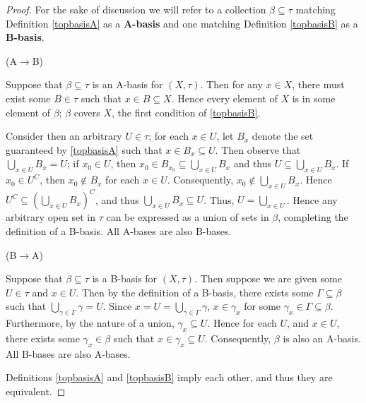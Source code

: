 \documentclass{article}
\theoremstyle{definition}
\newcommand{\p}[1]{\left(#1\right)}
\begin{document}
\begin{proof}
For the sake of discussion we will refer to a collection $\beta \subseteq\tau$ 
matching Definition \ref{topbasisA} as a \textbf{A-basis} 
and one matching Definition \ref{topbasisB} as a \textbf{B-basis}.

(A$\to$B)

Suppose that $\beta\subseteq\tau$ is an A-basis for $(X,\tau)$. Then for any $x \in X$, there must
exist some $B \in \tau$ such that $x \in B \subseteq X$. Hence every element of $X$ is in some
element of $\beta$; $\beta$ covers $X$, the first condition of \ref{topbasisB}. 

Consider then an arbitrary $U \in \tau$; for each $x \in U$, let $B_x$ denote the set guaranteed 
by \ref{topbasisA} such that $x \in B_x \subseteq U$. Then observe that 
$\bigcup_{x\in U} B_x = U$; if $x_0 \in U$, then $x_0 \in B_{x_0} \subseteq \bigcup_{x\in U} B_x$
and thus $U \subseteq \bigcup_{x\in U} B_x$. If $x_0 \in U^C$, then $x_0 \not\in B_x$ for each
$x\in U$. Consequently, $x_0 \not\in\bigcup_{x\in U} B_x$. Hence 
$U^C \subseteq \p{\bigcup_{x\in U} B_x}^C$, and thus $\bigcup_{x\in U} B_x \subseteq U$. Thus,
$U = \bigcup_{x\in U}$. Hence any arbitrary open set in $\tau$ can be expressed as a union of sets
in $\beta$, completing the definition of a B-basis. All A-bases are also B-bases.

(B$\to$A)

Suppose that $\beta\subseteq\tau$ is a B-basis for $(X,\tau)$. Then suppose we are given some 
$U \in \tau$ and $x \in U$. Then by the definition of a B-basis, there exists some 
$\Gamma \subseteq \beta$ such that $\bigcup_{\gamma \in \Gamma} \gamma = U$. Since
$x = U = \bigcup_{\gamma\in\Gamma} \gamma$, $x \in \gamma_x$ for some 
$\gamma_x \in \Gamma \subseteq \beta$. 
Furthermore, by the nature of a union, $\gamma_x \subseteq U$. 
Hence for each $U$, and $x \in U$, there exists some 
$\gamma_x \in \beta$ such that $x \in \gamma_x \subseteq U$. Consequently, $\beta$ is also an
A-basis. All B-bases are also A-bases.

Definitions \ref{topbasisA} and \ref{topbasisB} imply each other, and thus they are equivalent.
\end{proof}
\end{document}
